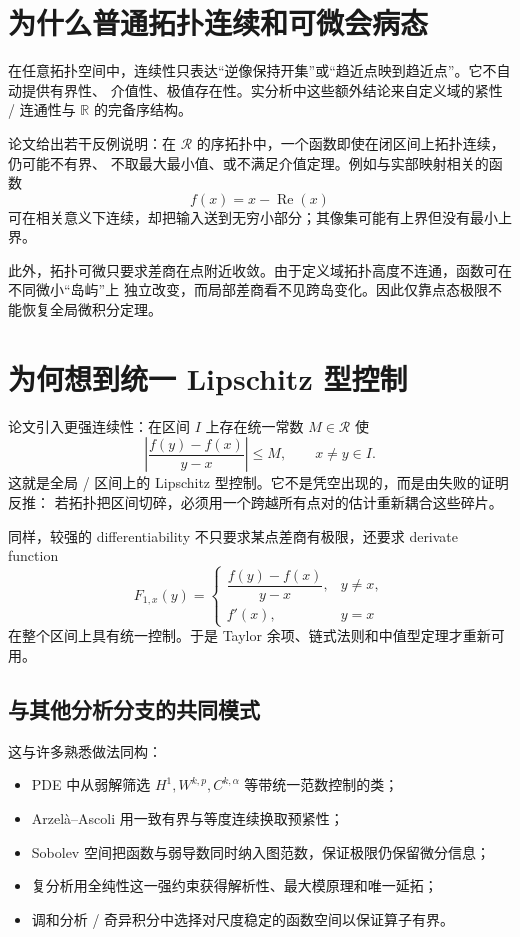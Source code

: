 \documentclass[11pt,a4paper]{article}
\theoremstyle{remark}
\newcommand{\LC}{\mathcal R}
\newcommand{\R}{\mathbb R}
\begin{document}
\section{为什么普通拓扑连续和可微会病态}

在任意拓扑空间中，连续性只表达“逆像保持开集”或“趋近点映到趋近点”。它不自动提供有界性、
介值性、极值存在性。实分析中这些额外结论来自定义域的紧性 / 连通性与 $\R$ 的完备序结构。

论文给出若干反例说明：在 $\LC$ 的序拓扑中，一个函数即使在闭区间上拓扑连续，仍可能不有界、
不取最大最小值、或不满足介值定理。例如与实部映射相关的函数
\[
f(x)=x-\operatorname{Re}(x)
\]
可在相关意义下连续，却把输入送到无穷小部分；其像集可能有上界但没有最小上界。

此外，拓扑可微只要求差商在点附近收敛。由于定义域拓扑高度不连通，函数可在不同微小“岛屿”上
独立改变，而局部差商看不见跨岛变化。因此仅靠点态极限不能恢复全局微积分定理。

\section{为何想到统一 Lipschitz 型控制}

论文引入更强连续性：在区间 $I$ 上存在统一常数 $M\in\LC$ 使
\[
\left|\frac{f(y)-f(x)}{y-x}\right|\le M,
\qquad x\ne y\in I.
\]
这就是全局 / 区间上的 Lipschitz 型控制。它不是凭空出现的，而是由失败的证明反推：
若拓扑把区间切碎，必须用一个跨越所有点对的估计重新耦合这些碎片。

同样，较强的 differentiability 不只要求某点差商有极限，还要求 derivate function
\[
F_{1,x}(y)=
\begin{cases}
\dfrac{f(y)-f(x)}{y-x},&y\ne x,\\[0.7em]
f'(x),&y=x
\end{cases}
\]
在整个区间上具有统一控制。于是 Taylor 余项、链式法则和中值型定理才重新可用。

\subsection{与其他分析分支的共同模式}

这与许多熟悉做法同构：

\begin{itemize}
\item PDE 中从弱解筛选 $H^1,W^{k,p},C^{k,\alpha}$ 等带统一范数控制的类；
\item Arzel\`a--Ascoli 用一致有界与等度连续换取预紧性；
\item Sobolev 空间把函数与弱导数同时纳入图范数，保证极限仍保留微分信息；
\item 复分析用全纯性这一强约束获得解析性、最大模原理和唯一延拓；
\item 调和分析 / 奇异积分中选择对尺度稳定的函数空间以保证算子有界。
\end{itemize}
\end{document}
